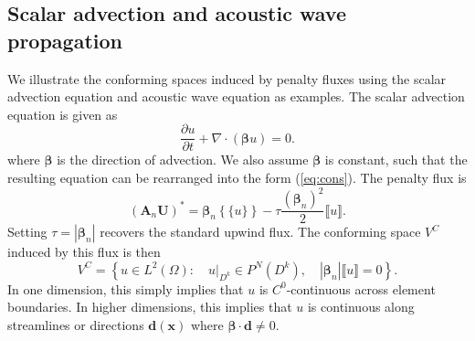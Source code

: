 \documentclass[preprint,10pt]{elsarticle}
\newcommand{\pd}[2]{\frac{\partial#1}{\partial#2}}
\newcommand{\LRp}[1]{\left( #1 \right)}
\newcommand{\LRb}[1]{\left| #1 \right|}
\newcommand{\LRc}[1]{\left\{ #1 \right\}}
\newcommand{\Div} {\ensuremath{\nabla\cdot}}
\newcommand{\jump}[1] {\ensuremath{\llbracket#1\rrbracket}}
\newcommand{\avg}[1] {\ensuremath{\LRc{\!\{#1\}\!}}}
\newcommand{\note}[1]{#1}
\begin{document}
\subsection{Scalar advection and acoustic wave propagation}
\label{sec:confexamples}
We illustrate the conforming spaces induced by penalty fluxes using the scalar advection equation and acoustic wave equation as examples.  The scalar advection equation is given as
\[
\pd{u}{t} + \Div\LRp{\bm{\beta}u} = 0.
\]
where $\bm{\beta}$ is the direction of advection.  \note{We also assume $\bm{\beta}$ is constant, such that the resulting equation can be rearranged into the form (\ref{eq:cons}).}  The penalty flux is 
\[
(\bm{A}_n\bm{U})^* = \bm{\beta}_n\avg{ u} - \tau\frac{\LRp{\bm{\beta}_n}^2}{2}\jump{u}.
\]
\note{Setting $\tau = \LRb{\bm{\beta}_n}$ recovers the standard upwind flux.}  
The conforming space $V^C$ induced by this flux is then
\[
V^C = \LRc{ u \in L^2\LRp{\Omega} : \quad \left.u\right|_{D^k} \in P^N(D^k), \quad \LRb{\bm{\beta}_n}\jump{u} = 0}.
\]
In one dimension, this simply implies that $u$ is $C^0$-continuous across element boundaries.  In higher dimensions, this implies that $u$ is continuous along streamlines or directions $\bm{d}(\bm{x})$ where $\bm{\beta}\cdot \bm{d} \neq 0$.  
\end{document}
